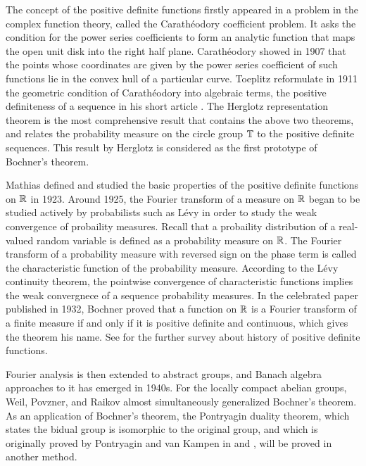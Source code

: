 \documentclass[a4paper]{article}
\begin{document}
The concept of the positive definite functions firstly appeared in a problem in the complex function theory, called the Carath\'eodory coefficient problem.
It asks the condition for the power series coefficients to form an analytic function that maps the open unit disk into the right half plane.
Carath\'eodory \cite{caratheodory1907variabilitatsbereich} showed in 1907 that the points whose coordinates are given by the power series coefficient of such functions lie in the convex hull of a particular curve.
Toeplitz reformulate in 1911 the geometric condition of Carath\'eodory into algebraic terms, the positive definiteness of a sequence in his short article \cite{toeplitz1911fourier}.
The Herglotz representation theorem is the most comprehensive result that contains the above two theorems, and relates the probability measure on the circle group $\mathbb{T}$ to the positive definite sequences.
This result by Herglotz \cite{herglotz1911uber} is considered as the first prototype of Bochner's theorem.

Mathias \cite{mathias1923positive} defined and studied the basic properties of the positive definite functions on $\mathbb{R}$ in 1923.
Around 1925, the Fourier transform of a measure on $\mathbb{R}$ began to be studied actively by probabilists such as L\'evy in order to study the weak convergence of probaility measures.
Recall that a probaility distribution of a real-valued random variable is defined as a probability measure on $\mathbb{R}$.
The Fourier transform of a probability measure with reversed sign on the phase term is called the characteristic function of the probability measure.
According to the L\'evy continuity theorem, the pointwise convergence of characteristic functions implies the weak convergnece of a sequence probability measures.
In the celebrated paper \cite{bochner1932vorlesungen} published in 1932, Bochner proved that a function on $\mathbb{R}$ is a Fourier transform of a finite measure if and only if it is positive definite and continuous, which gives the theorem his name.
See \cite{stewart1976positive} for the further survey about history of positive definite functions.

Fourier analysis is then extended to abstract groups, and Banach algebra approaches to it has emerged in 1940s.
For the locally compact abelian groups, Weil, Povzner, and Raikov almost simultaneously generalized Bochner's theorem. 
As an application of Bochner's theorem, the Pontryagin duality theorem, which states the bidual group is isomorphic to the original group, and which is originally proved by Pontryagin and van Kampen in \cite{pontrjagin1934theory} and \cite{van1935locally}, will be proved in another method.
\end{document}
